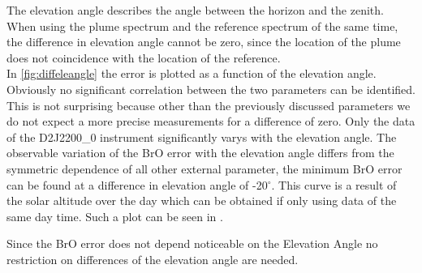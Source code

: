 The elevation angle describes the angle between the horizon and the zenith. When using the plume spectrum and the reference spectrum of the same time, the difference in elevation angle cannot be zero, since the location of the plume does not coincidence with the location of the reference.\\
In \cref{fig:diffeleangle} the  error is plotted as a function of the elevation angle. Obviously no significant correlation between the two parameters can be identified. This is not surprising because other than the previously discussed parameters we do not expect a more precise measurements for a difference of zero. 
Only the data of the D2J2200\_0 instrument significantly varys with the elevation angle. The observable variation of the BrO error with the elevation angle differs from the symmetric dependence of all other external parameter, the minimum BrO error can be found at a difference in elevation angle of -20$^{\circ}$. This curve is a result of the solar altitude over the day which can be obtained if only using data of the same day time. Such a plot can be seen in \cite{fig:d2j22000diffelevangleonetempnevad}.
	
Since the BrO error does not depend noticeable on the Elevation Angle no restriction on differences of the elevation angle are needed.
